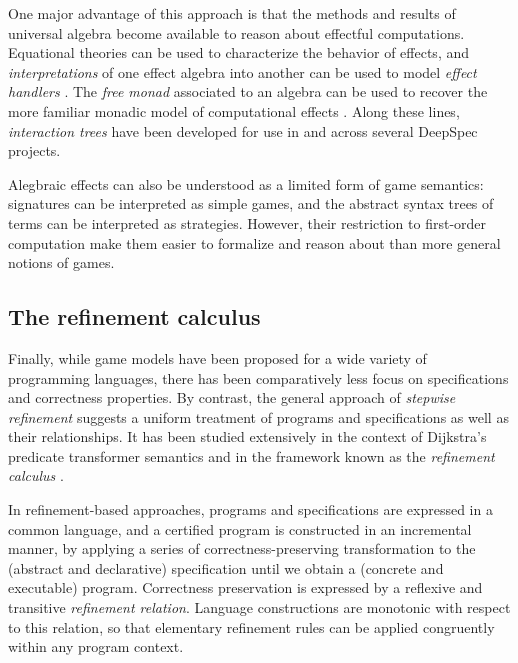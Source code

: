 \documentclass[draft,11pt]{report}
\theoremstyle{definition}
\begin{document}
One major advantage of this approach is that
the methods and results of universal algebra
become available to reason about effectful computations.
Equational theories can be used to characterize
the behavior of effects, and \emph{interpretations}
of one effect algebra into another can be used to model
\emph{effect handlers} \citep{eff}.
The \emph{free monad} associated to an algebra
can be used to recover the more familiar
monadic model of computational effects \citep{monads}.
Along these lines,
\emph{interaction trees} \citep{itree}
have been developed for use in and across
several DeepSpec projects.

Alegbraic effects can also be understood as
a limited form of game semantics:
signatures can be interpreted as simple games,
and the abstract syntax trees of terms
can be interpreted as strategies.
However,
their restriction to first-order computation
make them easier to formalize and reason about
than more general notions of games.



\subsection{The refinement calculus} %

Finally,
while game models have been proposed
for a wide variety of programming languages,
there has been comparatively less focus
on specifications and correctness properties.
By contrast,
the general approach of \emph{stepwise refinement}
suggests a uniform treatment of programs and specifications
as well as their relationships.
It has been studied extensively in the context of
Dijkstra's predicate transformer semantics \citep{gc}
and in the framework known as the \emph{refinement calculus} \citep{refcal}.

In refinement-based approaches,
programs and specifications are expressed in a common language,
and a certified program is constructed in an incremental manner,
by applying a series of correctness-preserving transformation
to the (abstract and declarative) specification
until we obtain a (concrete and executable) program.
Correctness preservation is expressed
by a reflexive and transitive \emph{refinement relation}.
Language constructions are monotonic with respect to this relation,
so that elementary refinement rules
can be applied congruently within any program context.
\end{document}
